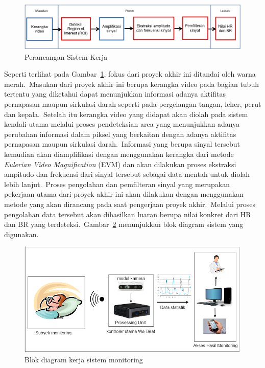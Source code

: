 \begin{figure}[ht]
	\vspace{0.5em}
	\centering
	\includegraphics[width=\textwidth]{diagramblok}
	\caption{Perancangan Sistem Kerja}
	\label{fig:diagramblok}   
\end{figure}

Seperti terlihat pada Gambar~\ref{fig:diagramblok}, fokus dari proyek akhir ini ditandai oleh warna merah.~Masukan dari proyek akhir ini berupa kerangka video pada bagian tubuh tertentu yang diketahui dapat menunjukkan informasi adanya aktifitas pernapasan maupun sirkulasi darah seperti pada pergelangan tangan, leher, perut dan kepala.~Setelah itu kerangka video yang didapat akan diolah pada sistem kendali utama melalui proses pendeteksian area yang menunjukkan adanya perubahan informasi dalam piksel yang berkaitan dengan adanya aktifitas pernapasan maupun sirkulasi darah.~Informasi yang berupa sinyal tersebut kemudian akan diamplifikasi dengan menggunakan kerangka dari metode \textit{Eulerian Video Magnification} (EVM) dan akan dilakukan proses ekstraksi ampitudo dan frekuensi dari sinyal tersebut sebagai data mentah untuk diolah lebih lanjut.~Proses pengolahan dan pemfilteran sinyal yang merupakan pekerjaan utama dari proyek akhir ini akan dilakukan dengan menggunakan metode yang akan dirancang pada saat pengerjaan proyek akhir.~Melalui proses pengolahan data tersebut akan dihasilkan luaran berupa nilai konkret dari HR dan BR yang terdeteksi.~Gambar~\ref{fig:diagramsistem} menunjukkan blok diagram sistem yang digunakan.

\begin{figure}[ht]
	\centering
	\includegraphics[width=\textwidth,height=0.35\linewidth]{diagram}
	\caption{Blok diagram kerja sistem monitoring}
	\label{fig:diagramsistem}   
\end{figure}
\newpage
